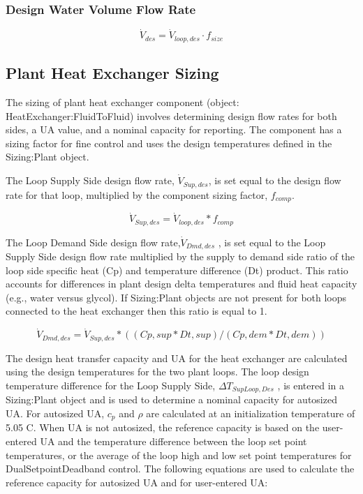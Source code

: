 \subsubsection{Design Water Volume Flow Rate}\label{design-boiler-water-flow-rate-1}

\begin{equation}
\dot V_{des} = \dot V_{loop,des} \cdot f_{size}
\end{equation}

\subsection{Plant Heat Exchanger Sizing}\label{plant-heat-exchanger-sizing}

The sizing of plant heat exchanger component (object: HeatExchanger:FluidToFluid) involves determining design flow rates for both sides, a UA value, and a nominal capacity for reporting. The component has a sizing factor for fine control and uses the design temperatures defined in the Sizing:Plant object.

The Loop Supply Side design flow rate, \({\dot V_{Sup,des}}\), is set equal to the design flow rate for that loop, multiplied by the component sizing factor, \({f_{comp}}\).

\begin{equation}
{\dot V_{Sup,des}} = {\dot V_{loop,des}}*{f_{comp}}
\end{equation}

The Loop Demand Side design flow rate,\({\dot V_{Dmd,des}}\) , is set equal to the Loop Supply Side design flow rate multiplied by the supply to demand side ratio of the loop side specific heat (Cp) and temperature difference (Dt) product. This ratio accounts for differences in plant design delta temperatures and fluid heat capacity (e.g., water versus glycol). If Sizing:Plant objects are not present for both loops connected to the heat exchanger then this ratio is equal to 1.

\begin{equation}
{\dot V_{Dmd,des}} = {\dot V_{Sup,des} * {((Cp,sup * Dt,sup) / (Cp,dem * Dt,dem))}}
\end{equation}

The design heat transfer capacity and UA for the heat exchanger are calculated using the design temperatures for the two plant loops. The loop design temperature difference for the Loop Supply Side, \(\Delta {T_{SupLoop,Des}}\) , is entered in a Sizing:Plant object and is used to determine a nominal capacity for autosized UA. For autosized UA, \(c_p\) and \(\rho\) are calculated at an initialization temperature of 5.05 C. When UA is not autosized, the reference capacity is based on the user-entered UA and the temperature difference between the loop set point temperatures, or the average of the loop high and low set point temperatures for DualSetpointDeadband control. The following equations are used to calculate the reference capacity for autosized UA and for user-entered UA:

